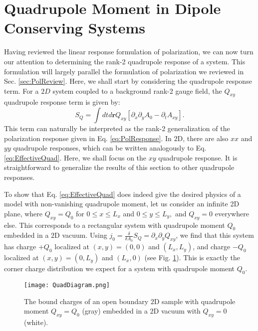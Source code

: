 \documentclass[prb,aps,twocolumn,groupaddress,floatfix]{revtex4-1}
\begin{document}
\section{Quadrupole Moment in Dipole Conserving Systems}\label{sec:DimRed}
Having reviewed the linear response formulation of polarization, we can now turn our attention to determining the rank-2 quadrupole response of a system. This formulation will largely parallel the formulation of polarization we reviewed in Sec. \ref{sec:PolReview}. Here, we shall start by considering the quadrupole response term. For a $2D$ system coupled to a background rank-2 gauge field, the $Q_{xy}$ quadrupole response term is given by\cite{you2019}:
\begin{equation}
S_{Q} = \int dt d\bm{r} Q_{xy} [\partial_x \partial_y A_{0}-\partial_t A_{xy}].
\label{eq:EffectiveQuad}
\end{equation}
This term can naturally be interpreted as the rank-2 generalization of the polarization response given in Eq. \ref{eq:PolResponse}. In $2$D, there are also $xx$ and $yy$ quadrupole responses, which can be written analogously to Eq. \ref{eq:EffectiveQuad}. Here, we shall focus on the $xy$ quadrupole response. It is straightforward to generalize the results of this section to other quadrupole responses.

To show that Eq. \ref{eq:EffectiveQuad} does indeed give the desired physics of a model with non-vanishing quadrupole moment, let us consider an infinite 2D plane, where $Q_{xy} = Q_0$ for $0\leq  x \leq L_x$ and  $0\leq  y \leq L_y,$ and  $Q_{xy} = 0$ everywhere else. This corresponds to a rectangular system with quadrupole moment $Q_0$ embedded in a $2$D vacuum. Using $j_0 = \frac{\delta}{\delta A_0} S_Q = \partial_x \partial_y Q_{xy}$, we find that this system has charge $+Q_0$ localized at $(x,y) = (0,0)$ and $(L_x,L_y)$, and charge $-Q_0$  localized at $(x,y) = (0,L_y)$ and $(L_x,0)$ (see Fig. \ref{fig:QuadDiagram}). This is exactly the corner charge distribution we expect for a system with quadrupole moment $Q_0$.
\begin{figure}
\texttt{[image: QuadDiagram.png]}
\caption{The bound charges of an open boundary $2$D sample with quadrupole moment $Q_{xy} = Q_0$ (gray) embedded in a $2$D vacuum with $Q_{xy} = 0$ (white).}\label{fig:QuadDiagram}
\end{figure}
\end{document}
